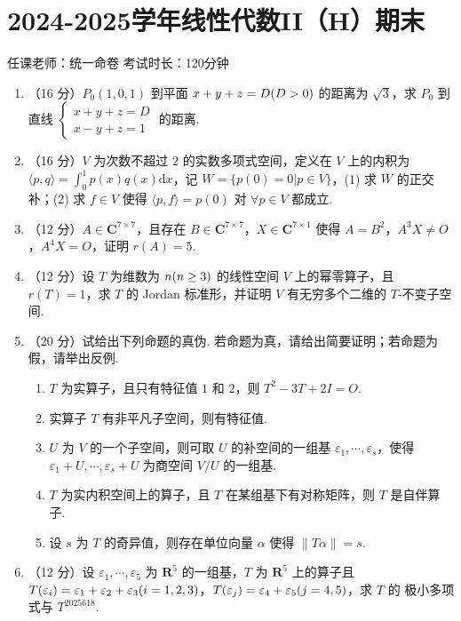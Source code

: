 \section{2024-2025学年线性代数II（H）期末}

\begin{center}
    任课老师：统一命卷\hspace{4em} 考试时长：120分钟
\end{center}

\begin{enumerate}
    \item （16 分）$P_0(1,0,1)$ 到平面 $x+y+z=D\space(D>0)$ 的距离为 $\sqrt{3}$，求 $P_0$ 到直线 $\begin{cases}x+y+z=D \\ x-y+z=1\end{cases}$ 的距离.
    \item （16 分）$V$ 为次数不超过 $2$ 的实数多项式空间，定义在 $V$ 上的内积为 $\langle p,q \rangle = \int_0^1 p(x)q(x)\mathrm{d}x$，记 $W=\{p(0)=0\vert p\in V\}$，(1) 求 $W$ 的正交补；(2) 求 $f\in V$ 使得 $\langle p,f \rangle = p(0)$ 对 $\forall p\in V$ 都成立.
    \item （12 分）$A\in\mathbf{C}^{7\times 7}$，且存在 $B\in\mathbf{C}^{7\times 7}$，$X\in\mathbf{C}^{7\times 1}$ 使得 $A=B^2$，$A^3 X\neq O$，$A^4 X=O$，证明 $r(A)=5$.
    \item （12 分）设 $T$ 为维数为 $n\space(n\ge 3)$ 的线性空间 $V$ 上的幂零算子，且 $r(T)=1$，求 $T$ 的 Jordan 标准形，并证明 $V$ 有无穷多个二维的 $T$-不变子空间.
    \item （20 分）试给出下列命题的真伪. 若命题为真，请给出简要证明；若命题为假，请举出反例.
    \begin{enumerate}
        \item $T$ 为实算子，且只有特征值 $1$ 和 $2$，则 $T^2-3T+2I=O$.
        \item 实算子 $T$ 有非平凡子空间，则有特征值.
        \item $U$ 为 $V$ 的一个子空间，则可取 $U$ 的补空间的一组基 $\varepsilon_1,\cdots,\varepsilon_s$，使得 $\varepsilon_1+U,\cdots,\varepsilon_s+U$ 为商空间 $V/U$ 的一组基.
        \item $T$ 为实内积空间上的算子，且 $T$ 在某组基下有对称矩阵，则 $T$ 是自伴算子.
        \item 设 $s$ 为 $T$ 的奇异值，则存在单位向量 $\alpha$ 使得 $\|T\alpha\|=s$.
    \end{enumerate}
    \item （12 分）设 $\varepsilon_1,\cdots,\varepsilon_5$ 为 $\mathbf{R}^5$ 的一组基，$T$ 为 $\mathbf{R}^5$ 上的算子且 $T(\varepsilon_i)=\varepsilon_1+\varepsilon_2+\varepsilon_3\space(i=1,2,3)$，$T(\varepsilon_j)=\varepsilon_4+\varepsilon_5\space(j=4,5)$，求 $T$ 的 极小多项式与 $T^{2025618}$.

\end{enumerate}
